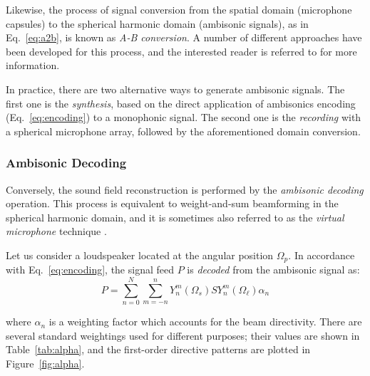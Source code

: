 Likewise, the process of signal conversion from the spatial domain (microphone capsules) to the spherical harmonic domain (ambisonic signals), as in Eq.~\ref{eq:a2b}, is known as \textit{A-B conversion}. A number of different approaches have been developed for this process, and the interested reader is referred to \cite{moreau20063d} for more information.

In practice, there are two alternative ways to generate ambisonic signals. The first one is the \textit{synthesis}, based on the direct application of ambisonics encoding (Eq.~\ref{eq:encoding}) to a monophonic signal. The second one is the \textit{recording} with a spherical microphone array, followed by the aforementioned domain conversion. 


\subsubsection{Ambisonic Decoding}
Conversely, the sound field reconstruction is performed by the \textit{ambisonic decoding} operation. This process is equivalent to weight-and-sum beamforming in the spherical harmonic domain, and it is sometimes also referred to as the \textit{virtual microphone} technique \cite{zotter2019ambisonics}.

Let us consider a loudspeaker located at the angular position $\Omega_p$. In accordance with Eq.~\ref{eq:encoding}, the signal feed $P$ is \textit{decoded} from the ambisonic signal as:
\begin{equation}
	P = \sum_{n=0}^{N} \sum_{m=-n}^{n} Y_n^m(\Omega_s) S Y_n^m(\Omega_\ell)  \alpha_n 
	\label{eq:decoding}
\end{equation}

where $\alpha_n$ is a weighting factor which accounts for the beam directivity.
There are several standard weightings used for different purposes; their values are shown in Table~\ref{tab:alpha}, and the first-order directive patterns are plotted in Figure~\ref{fig:alpha}.

